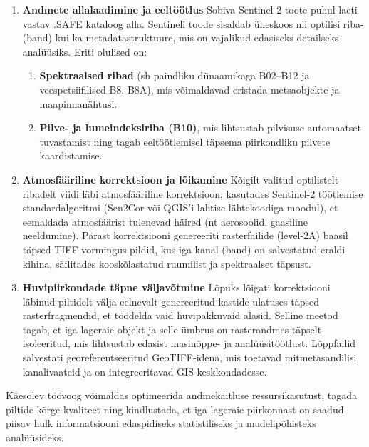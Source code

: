 \begin{enumerate}[topsep=1pt,itemsep=1ex,partopsep=1ex,parsep=1ex]
\item \textbf{Andmete allalaadimine ja eeltöötlus} \newline
 Sobiva Sentinel-2 toote puhul laeti
vastav .SAFE kataloog alla. Sentineli toode sisaldab üheskoos nii optilisi riba-
(band) kui ka metadatastruktuure, mis on vajalikud edasiseks detailseks
analüüsiks. Eriti olulised on:

\begin{enumerate}
\item \textbf{Spektraalsed ribad} (sh paindliku dünaamikaga B02--B12 ja veespetsiifilised B8,
B8A), mis võimaldavad eristada metsaobjekte ja maapinnanähtusi.

\item \textbf{Pilve- ja lumeindeksiriba (B10)}, mis lihtsustab pilvisuse automaatset
tuvastamist ning tagab eeltöötlemisel täpsema piirkondliku pilvete kaardistamise.
\end{enumerate}

\item \textbf{Atmosfääriline korrektsioon ja lõikamine} \newline
Kõigilt valitud optilistelt ribadelt
viidi läbi atmosfääriline korrektsioon, kasutades Sentinel-2 töötlemise
standardalgoritmi (Sen2Cor või QGIS'i lahtise lähtekoodiga moodul), et eemaldada
atmosfäärist tulenevad häired (nt aerosoolid, gaasiline neeldumine). Pärast
korrektsiooni genereeriti rasterfailide (level-2A) baasil täpsed TIFF-vormingus
pildid, kus iga kanal (band) on salvestatud eraldi kihina, säilitades
kooskõlastatud ruumilist ja spektraalset täpsust.

\item \textbf{Huvipiirkondade täpne väljavõtmine} \newline
Lõpuks lõigati korrektsiooni läbinud
piltidelt välja eelnevalt genereeritud kastide ulatuses täpsed rasterfragmendid,
et töödelda vaid huvipakkuvaid alasid. Selline meetod tagab, et iga lageraie
objekt ja selle ümbrus on rasterandmes täpselt isoleeritud, mis lihtsustab
edasist masinõppe- ja analüüsitöötlust. Lõppfailid salvestati
georeferentseeritud GeoTIFF-idena, mis toetavad mitmetasandilisi kanalivaateid
ja on integreeritavad GIS-keskkondadesse.

\end{enumerate}
Käesolev töövoog võimaldas optimeerida andmekäitluse ressursikasutust, tagada
piltide kõrge kvaliteet ning kindlustada, et iga lageraie piirkonnast on saadud
piisav hulk informatsiooni edaspidiseks statistiliseks ja mudelipõhisteks
analüüsideks.


